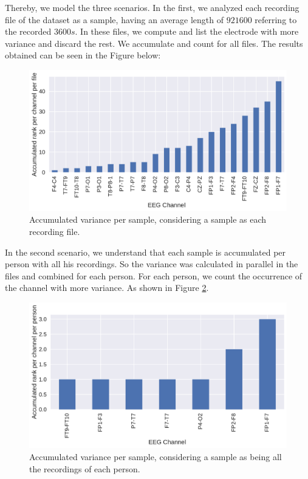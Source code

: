 Thereby, we model the three scenarios. In the first, we analyzed each recording file of the dataset as a sample, having an average length of $921600$ referring to the recorded $3600s$. In these files, we compute and list the electrode with more variance and discard the rest. We accumulate and count for all files. The results obtained can be seen in the Figure below:

\begin{figure}[!ht]
  \centering
  \includegraphics[width=\linewidth]{figure/variance_per_file.pdf}
  \caption{Accumulated variance per sample, considering a sample as each recording file.}
  \label{fig:variance_per_file}
\end{figure}

In the second scenario, we understand that each sample is accumulated per person with all his recordings. So the variance was calculated in parallel in the files and combined for each person. For each person, we count the occurrence of the channel with more variance. As shown in Figure \ref{fig:variance_per_person}.


\begin{figure}[!ht]
  \centering
  \includegraphics[width=\linewidth]{figure/variance_per_person.pdf}
  \caption{Accumulated variance per sample, considering a sample as being all the recordings of each person.}
  \label{fig:variance_per_person}
\end{figure}



